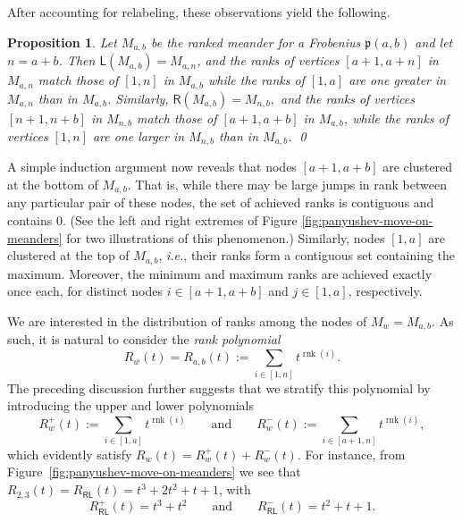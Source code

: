 \documentclass{amsart}
\def\fp{\mathfrak p} %
\newcommand{\pab}[1][a,b]{\fp(#1)}
\newcommand{\Rfull}[1]{R_{#1}}
\newcommand{\Rtop}[1]{R_{#1}^+}
\newcommand{\Rbot}[1]{R_{#1}^-}
\def\rnk{\operatorname{rnk}}
\def\pL{\mathsf L}
\def\pR{\mathsf R}
\newtheorem{proposition}[theorem]{Proposition}
\theoremstyle{definition}
\begin{document}
After accounting for  relabeling, these observations yield the following.

\begin{proposition}
\label{th:meander-graph-growth-properties}
Let $M_{a,b}$ be the ranked meander for a Frobenius $\pab$ and let $n=a+b$. 
Then 
\(
\pL(M_{a,b})= M_{a,n}
\), and the ranks of vertices $[a+1,a+n]$ in $M_{a,n}$ match those of $[1,n]$ in $M_{a,b}$ while the ranks of $[1,a]$ are one greater in $M_{a,n}$ than in $M_{a,b}$.
Similarly,
\(
\pR(M_{a,b}) = M_{n,b},
\)
and the ranks of vertices $[n+1,n+b]$ in $M_{n,b}$ match those of  $[a+1,a+b]$ in $M_{a,b}$, while the ranks of vertices $[1,n]$ are one larger in $M_{n,b}$ than in $M_{a,b}$. 
\qed
\end{proposition}

A simple induction argument now reveals that nodes $[a+1,a+b]$ are clustered at the bottom of $M_{a,b}$. That is, while there may be large jumps in rank between any particular pair of these nodes, the set of achieved ranks is contiguous and contains 0. (See the left and right extremes of Figure \ref{fig:panyushev-move-on-meanders} for two illustrations of this phenomenon.)  Similarly, nodes $[1,a]$ are clustered at the top of $M_{a,b}$, {\it i.e.}, their ranks form a contiguous set containing the maximum.  Moreover, the minimum and maximum ranks are achieved exactly once each, for distinct nodes $i \in [a+1,a+b]$ and  $j  \in [1,a]$, respectively.

We are  interested in the distribution of ranks among the nodes of  $M_w=M_{a,b}$. As such, it is natural to consider the \emph{rank polynomial} 
$$
    \Rfull{w}(t) = \Rfull{a,b}(t) := \sum_{i \in [1,n]} t^{\rnk(i)}.
$$
The preceding discussion further suggests that we stratify this polynomial by introducing the upper and lower polynomials 
$$
\Rtop{w}(t) := \sum_{i \in [1,a]} t^{\rnk(i)}
\qquad\text{and}\qquad
\Rbot{w}(t) := \sum_{i \in [a+1,n]} t^{\rnk(i)},
$$
which evidently satisfy $\Rfull{w}(t)=\Rtop{w}(t)+\Rbot{w}(t)$.  For instance, from Figure~\ref{fig:panyushev-move-on-meanders} we see that $\Rfull{2,3}(t)=\Rfull{\pR\pL}(t)=t^3+2t^2+t+1$, with 
\begin{equation}
\label{eq:runningex1}
    \Rtop{\pR\pL}(t)=t^3+t^2
    \qquad\text{and}\qquad
    \Rbot{\pR\pL}(t)=t^2+t+1.
\end{equation}
\end{document}
